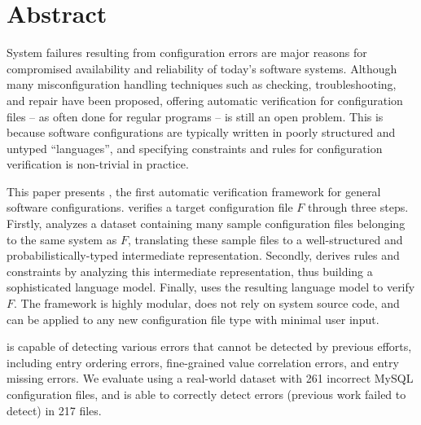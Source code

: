 
\section*{Abstract}

System failures resulting from configuration errors 
are major reasons for compromised availability and
reliability of today's software systems.
Although many misconfiguration handling techniques
such as checking, troubleshooting, and repair
have been proposed, 
offering automatic verification for configuration files -- as often  
done for regular programs -- is still an open problem.
This is because software configurations are typically written in
poorly structured and untyped ``languages'', and 
specifying constraints and rules for configuration 
verification is non-trivial in practice.

This paper presents \app, the first automatic verification framework for
general software configurations.
\app verifies a target configuration file $F$ through three steps.
Firstly, \app analyzes a dataset containing many sample configuration 
files belonging to the same system as $F$,
translating these sample files to a
well-structured and probabilistically-typed 
intermediate representation.
Secondly, \app derives rules and constraints by analyzing
this intermediate representation, thus building a
sophisticated language model.
Finally, \app uses the resulting language model to verify $F$.
The \app framework is highly modular, 
does not rely on system source code, and
can be applied to any new configuration file type with minimal user input. 

\app is capable of detecting various errors that cannot
be detected by previous efforts,
including entry ordering errors, fine-grained value correlation errors, 
and entry missing errors. 
We evaluate \app using a real-world dataset with 261 incorrect 
MySQL configuration files,
and \app is able to correctly 
detect errors (previous work failed to
detect) in 217 files.
